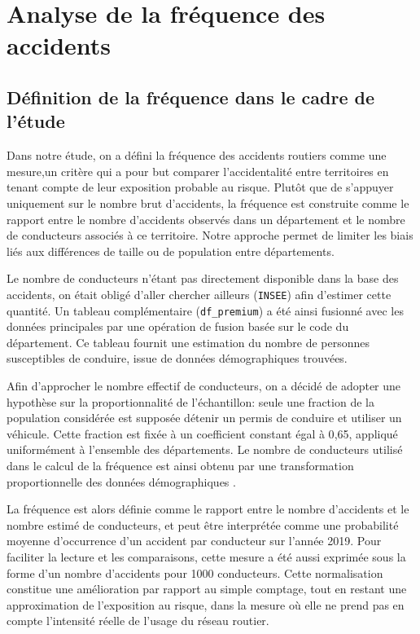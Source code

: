 \documentclass[11pt,a4paper]{article}
\begin{document}
\section{Analyse de la fréquence des accidents}

\subsection{Définition de la fréquence dans le cadre de l’étude}

Dans notre étude, on a défini la fréquence des accidents routiers comme une mesure,un critère qui a pour but comparer
l’accidentalité entre territoires en tenant compte de leur exposition probable au risque. Plutôt que
de s’appuyer uniquement sur le nombre brut d’accidents, la fréquence est construite comme le rapport
entre le nombre d’accidents observés dans un département et le nombre de conducteurs associés à ce
territoire. Notre approche permet de limiter les biais liés aux différences de taille ou de population
entre départements.

Le nombre de conducteurs n’étant pas directement disponible dans la base des accidents, on était obligé d'aller chercher ailleurs (\texttt{INSEE}) afin d’estimer cette quantité. Un tableau complémentaire (\texttt{df\_premium})
a été ainsi fusionné avec les données principales par une opération de fusion basée sur le code du département.
Ce tableau fournit une estimation du nombre de personnes susceptibles de conduire, issue de données
démographiques trouvées.

Afin d’approcher le nombre effectif de conducteurs, on a décidé de adopter une hypothèse sur la proportionnalité de l’échantillon:
seule une fraction de la population considérée est supposée détenir un permis de conduire et utiliser
un véhicule. Cette fraction est fixée à un coefficient constant égal à 0{,}65, appliqué 
uniformément à l’ensemble des départements. Le nombre de conducteurs utilisé dans le calcul de la fréquence
est ainsi obtenu par une transformation proportionnelle des données démographiques .

La fréquence est alors définie comme le rapport entre le nombre d’accidents et le nombre estimé de
conducteurs, et peut être interprétée comme une probabilité moyenne d’occurrence d’un accident par
conducteur sur l’année 2019. Pour faciliter la lecture et les comparaisons, cette mesure a été aussi
exprimée sous la forme d’un nombre d’accidents pour 1000 conducteurs. Cette normalisation constitue
une amélioration par rapport au simple comptage, tout en restant une approximation de l’exposition au
risque, dans la mesure où elle ne prend pas en compte l’intensité réelle de l’usage du réseau routier.
\end{document}
